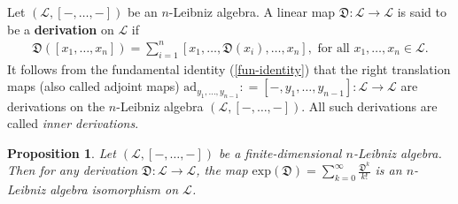 \documentclass[a4paper,reqno,10pt]{amsart}
\theoremstyle{plain}
\newtheorem{prop}[thm]{Proposition}
\theoremstyle{definition}
\theoremstyle{remark}
\begin{document}
\medskip

Let $(\mathcal{L}, [-, \ldots, -])$ be an $n$-Leibniz algebra. A linear map $\mathfrak{D} : \mathcal{L} \rightarrow \mathcal{L}$ is said to be a {\bf derivation} on $\mathcal{L}$ if
\begin{align}\label{deri-iden}
    \mathfrak{D} ([x_1, \ldots, x_n]) = \sum_{i=1}^n [x_1, \ldots, \mathfrak{D}(x_i), \ldots, x_n], \text{ for all } x_1, \ldots, x_n \in \mathcal{L}.
\end{align}
It follows from the fundamental identity (\ref{fun-identity}) that the right translation maps (also called adjoint maps) $\mathrm{ad}_{y_1, \ldots, y_{n-1}} : = [-, y_1, \ldots, y_{n-1}] : \mathcal{L} \rightarrow \mathcal{L}$ are derivations on the $n$-Leibniz algebra $(\mathcal{L}, [-, \ldots, -])$. All such derivations are called {\em inner derivations}.

\begin{prop}\label{prop-expo}
    Let $(\mathcal{L}, [-, \ldots, -])$ be a finite-dimensional $n$-Leibniz algebra. Then for any derivation $\mathfrak{D} : \mathcal{L} \rightarrow \mathcal{L}$, the map $\mathrm{exp} (\mathfrak{D}) = \sum_{k=0}^\infty \frac{\mathfrak{D}^k }{k ! }$ is an $n$-Leibniz algebra isomorphism on $\mathcal{L}$.
\end{prop}
\end{document}
